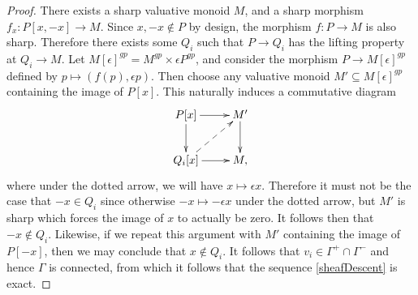 \documentclass[12pt]{amsart}
\numberwithin{equation}{section}
\theoremstyle{plain}
\theoremstyle{remark}
\begin{document}
\begin{proof}
	There exists a sharp valuative monoid $M$, and a sharp morphism $f_x: P[x,-x]\to M$. Since $x,-x\not\in P$ by design, the morphism $f: P\to M$ is also sharp. Therefore there exists some $Q_i$ such that $P\to Q_i$ has the lifting property at $Q_i\to M$. Let $M[\epsilon]^{gp} = M^{gp}\times \epsilon P^{gp}$, and consider the morphism $P\to M[\epsilon]^{gp}$ defined by $p\mapsto (f(p), \epsilon p)$. Then choose any valuative monoid $M'\subseteq M[\epsilon]^{gp}$ containing the image of $P[x]$. This naturally induces a commutative diagram
$$\xymatrix{
	P[x] \ar[r]\ar[d] & M'\ar[d]\\
	Q_i[x] \ar[r]\ar@{-->}[ur] & M,\\
	}$$
where under the dotted arrow, we will have $x\mapsto \epsilon x$. Therefore it must not be the case that $-x\in Q_i$ since otherwise $-x\mapsto -\epsilon x$ under the dotted arrow, but $M'$ is sharp which forces the image of $x$ to actually be zero. It follows then that $-x\not\in Q_i$. Likewise, if we repeat this argument with $M'$ containing the image of $P[-x]$, then we may conclude that $x\not\in Q_i$. It follows that $v_i\in \Gamma^+\cap \Gamma^-$ and hence $\Gamma$ is connected, from which it follows that the sequence \eqref{sheafDescent} is exact. 
\end{proof}
\end{document}
